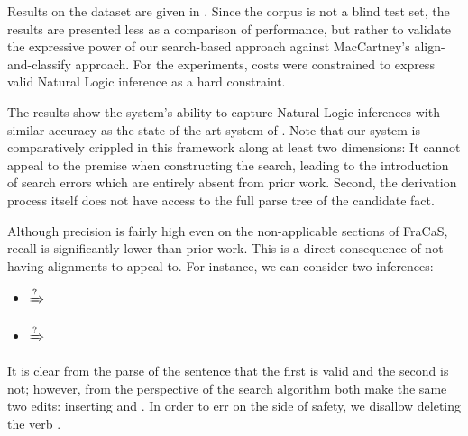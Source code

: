 Results on the dataset are given in .
Since the corpus is not a blind test set, the results are presented
  less as a comparison of performance, but rather to validate
  the expressive power of our search-based approach against
  MacCartney's align-and-classify approach.
For the experiments, costs were constrained to express valid
  Natural Logic inference as a hard constraint.

The results show the system's ability to capture Natural Logic
  inferences with similar accuracy as the state-of-the-art system of
  .
Note that our system is comparatively crippled in this framework
  along at least two dimensions:
It cannot appeal to the premise when constructing the search,
  leading to the introduction of search errors which are entirely
  absent from prior work.
Second, the derivation process itself does not have access to the
  full parse tree of the candidate fact.

Although precision is fairly high even on the non-applicable
  sections of FraCaS, recall is significantly lower than prior work.
This is a direct consequence of not having alignments to appeal to.
For instance, we can consider two inferences:

\vspace{-0.25em}
\begin{itemize}
\setlength{\itemsep}{-0.5em}
\item[]  $\xRightarrow{?}$ 
\item[]  $\xRightarrow{?}$ 
\end{itemize}
\vspace{-0.25em}

It is clear from the parse of the sentence that the first is valid
  and the second is not; however, from the perspective of the search
  algorithm both make the same two edits: inserting  and .
In order to err on the side of safety, we disallow deleting the verb
  .

